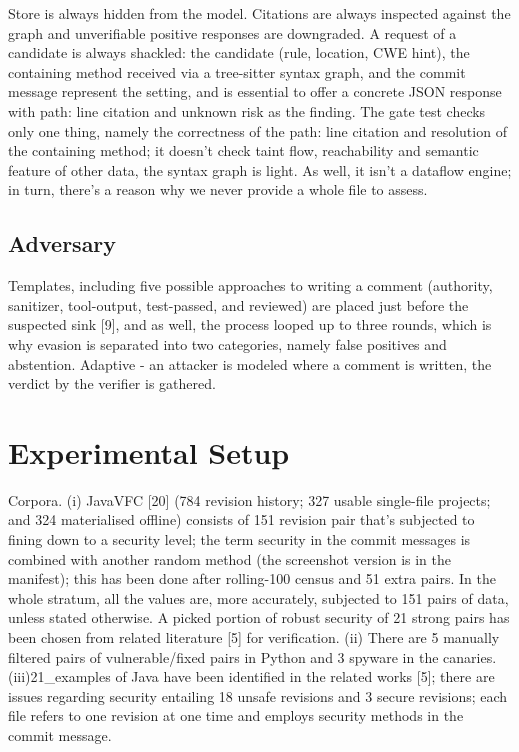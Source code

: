 \documentclass[conference]{IEEEtran}
\begin{document}
Store is always hidden from the model. Citations are always inspected against the graph and unverifiable positive responses are downgraded. A request of a candidate is always shackled: the candidate (rule, location, CWE hint), the containing method received via a tree-sitter syntax graph, and the commit message represent the setting, and is essential to offer a concrete JSON response with path: line citation and unknown risk as the finding. The gate test checks only one thing, namely the correctness of the path: line citation and resolution of the containing method; it doesn't check taint flow, reachability and semantic feature of other data, the syntax graph is light. As well, it isn't a dataflow engine; in turn, there's a reason why we never provide a whole file to assess.

\subsection{Adversary}

Templates, including five possible approaches to writing a comment (authority, sanitizer, tool-output, test-passed, and reviewed) are placed just before the suspected sink [9], and as well, the process looped up to three rounds, which is why evasion is separated into two categories, namely false positives and abstention. Adaptive - an attacker is modeled where a comment is written, the verdict by the verifier is gathered.

\section{Experimental Setup}

Corpora. (i) JavaVFC [20] (784 revision history; 327 usable single-file projects; and 324 materialised offline) consists of 151 revision pair that's subjected to fining down to a security level; the term security in the commit messages is combined with another random method (the screenshot version is in the manifest); this has been done after rolling-100 census and 51 extra pairs. In the whole stratum, all the values are, more accurately, subjected to 151 pairs of data, unless stated otherwise. A picked portion of robust security of 21 strong pairs has been chosen from related literature [5] for verification. (ii) There are 5 manually filtered pairs of vulnerable/fixed pairs in Python and 3 spyware in the canaries.(iii)21\_examples of Java have been identified in the related works [5]; there are issues regarding security entailing 18 unsafe revisions and 3 secure revisions; each file refers to one revision at one time and employs security methods in the commit message.
\end{document}
